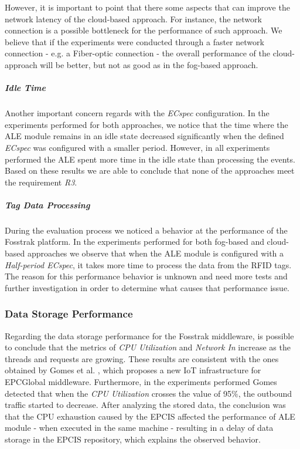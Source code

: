However, it is important to point that there some aspects that can improve the network latency
of the cloud-based approach. For instance, the network connection is a possible bottleneck for the
performance of such approach. We believe that if the experiments were conducted through a faster
network connection - e.g. a Fiber-optic connection - the overall performance of the cloud-approach
will be better, but not as good as in the fog-based approach.

\subparagraph{Idle Time}
\label{subp:eval_idle_time}
Another important concern regards with the \textit{ECspec} configuration. In the experiments
performed for both approaches, we notice that the time where the \gls{ALE} module remains in an idle
state decreased significantly when the defined \textit{ECspec} was configured with a smaller period.
However, in all experiments performed the \gls{ALE} spent more time in the idle state than
processing the events. Based on these results we are able to conclude that none of the approaches
meet the requirement \textit{R3}.

\subparagraph{Tag Data Processing}
\label{subp:eval_tag_processing}
During the evaluation process we noticed a behavior at the performance of the Fosstrak platform.
In the experiments performed for both fog-based and cloud-based approaches we observe that when
the \gls{ALE} module is configured with a \textit{Half-period ECspec}, it takes more time to
process the data from the \gls{RFID} tags. The reason for this performance behavior is unknown and
need more tests and further investigation in order to determine what causes that performance issue.

\subsubsection{Data Storage Performance}
\label{subs:eval_results_data}
Regarding the data storage performance for the Fosstrak middleware, is possible to conclude that the metrics
of \textit{CPU Utilization} and \textit{Network In} increase as the threads and requests are growing.
These results are consistent with the ones obtained by Gomes et al. \cite{gomes2014future}, which
proposes a new \gls{IoT} infrastructure for \gls{EPC}Global middleware. Furthermore, in the experiments
performed Gomes detected that when the \textit{CPU Utilization} crosses the value of 95$\%$, the
outbound traffic started to decrease. After analyzing the stored data, the conclusion was that the
\gls{CPU} exhaustion caused by the \gls{EPCIS} affected the performance of \gls{ALE} module - when
executed in the same machine - resulting in a delay of data storage in the \gls{EPCIS} repository,
which explains the observed behavior.\\

